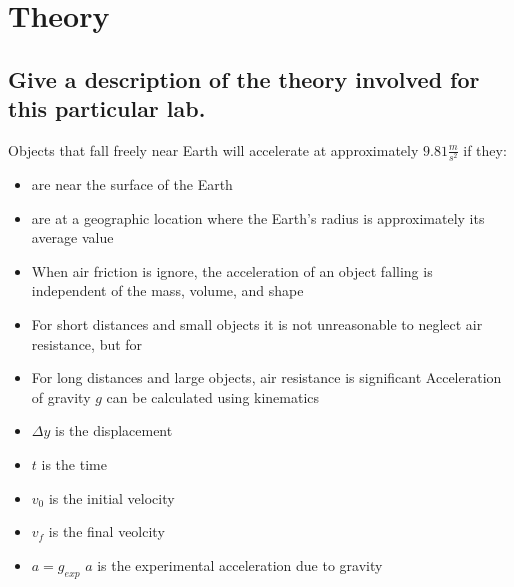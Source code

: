 \chapter{Theory}
\section{Give a description of the theory involved for this particular lab.}
Objects that fall freely near Earth will accelerate at approximately $9.81\frac{m}{s^2}$
if they:
\begin{itemize}
  \item are near the surface of the Earth
  \item are at a geographic location where the Earth's radius is approximately its average value
  \item When air friction is ignore, the acceleration of an object falling is independent of the mass,
    volume, and shape
  \item For short distances and small objects it is not unreasonable to neglect air resistance, but for
  \item For long distances and large objects, air resistance is significant
Acceleration of gravity $g$ can be calculated using kinematics
  \item $\Delta y$ is the displacement
  \item $t$ is the time
  \item $v_0$ is the initial velocity
  \item $v_f$ is the final veolcity
  \item $a = g_{exp}$ $a$ is the experimental acceleration due to gravity
\end{itemize}

